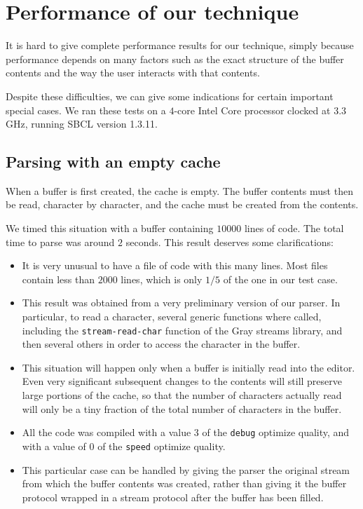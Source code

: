 \section{Performance of our technique}

It is hard to give complete performance results for our technique,
simply because performance depends on many factors such as the exact
structure of the buffer contents and the way the user interacts with
that contents.

Despite these difficulties, we can give some indications for certain
important special cases.  We ran these tests on a $4$-core Intel Core
processor clocked at $3.3$GHz, running SBCL version 1.3.11.

\subsection{Parsing with an empty cache}

When a buffer is first created, the cache is empty.  The buffer
contents must then be read, character by character, and the cache must
be created from the contents.

We timed this situation with a buffer containing $10000$ lines of
\commonlisp{} code.  The total time to parse was around $2$ seconds.
This result deserves some clarifications:

\begin{itemize}
\item It is very unusual to have a file of \commonlisp{} code with
  this many lines.  Most files contain less than $2000$ lines, which
  is only $1/5$ of the one in our test case.
\item This result was obtained from a very preliminary version of our
  parser.  In particular, to read a character, several generic
  functions where called, including the \texttt{stream-read-char}
  function of the Gray streams library, and then several others in
  order to access the character in the buffer.
\item This situation will happen only when a buffer is initially read
  into the editor.  Even very significant subsequent changes to the
  contents will still preserve large portions of the cache, so that
  the number of characters actually read will only be a tiny fraction
  of the total number of characters in the buffer.
\item All the code was compiled with a value $3$ of the \texttt{debug}
  optimize quality, and with a value of $0$ of the \texttt{speed}
  optimize quality.
\item This particular case can be handled by giving the parser the
  original stream from which the buffer contents was created, rather
  than giving it the buffer protocol wrapped in a stream protocol
  after the buffer has been filled.
\end{itemize}

